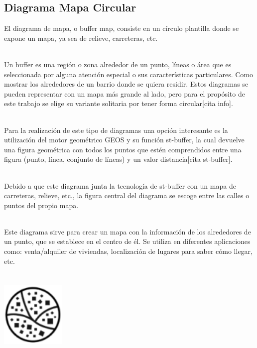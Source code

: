 \documentclass{article}\usepackage[]{graphicx}\usepackage[]{color}
\begin{document}
\subsection{Diagrama Mapa Circular}
El diagrama de mapa, o buffer map, consiste en un c\'irculo plantilla donde se expone un mapa, ya sea de relieve, carreteras, etc.~\\~\par
Un buffer es una regi\'on o zona alrededor de un punto, l\'ineas o \'area que es seleccionada por alguna atenci\'on especial o sus caracter\'isticas particulares. Como mostrar los alrededores de un barrio donde se quiera residir. Estos diagramas se pueden representar con un mapa m\'as grande al lado, pero para el prop\'osito de este trabajo se elige su variante solitaria por tener forma circular[cita info].~\\~\par
Para la realizaci\'on de este tipo de diagramas una opci\'on interesante es la utilizaci\'on del motor geom\'etrico GEOS y su funci\'on st-buffer, la cual devuelve una figura geom\'etrica con todos los puntos que est\'en comprendidos entre una figura (punto, l\'inea, conjunto de l\'ineas) y un valor distancia[cita st-buffer].~\\~\par
Debido a que este diagrama junta la tecnolog\'ia de st-buffer con un mapa de carreteras, relieve, etc., la figura central del diagrama se escoge entre las calles o puntos del propio mapa.~\\~\par
Este diagrama sirve para crear un mapa con la informaci\'on de los alrededores de un punto, que se establece en el centro de \'el. Se utiliza en diferentes aplicaciones como: venta/alquiler de viviendas, localizaci\'on de lugares para saber c\'omo llegar, etc.
~\\~\\~\\
\vbox{
    \centering
    \includegraphics[width=0.23\textwidth]{imag/carreteras}
}
\end{document}
